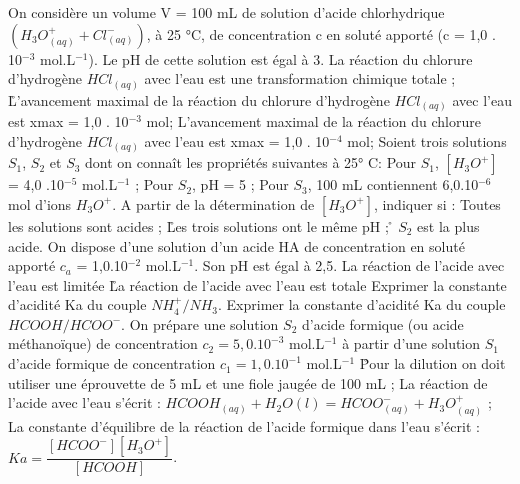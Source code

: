 \q	
   On considère un volume V = 100 mL de solution d'acide chlorhydrique $(H_3O^+_{(aq)} + Cl^-_{(aq)})$, à 25 °C, de concentration c en soluté apporté (c = 1,0 . 10$^{-3}$ mol.L$^{-1}$). Le pH de cette solution est égal à 3. 
\rv
  La réaction du chlorure d'hydrogène $HCl_{(aq)}$ avec l'eau est une transformation chimique totale ;
\r
  L'avancement maximal de la réaction du chlorure d'hydrogène $HCl_{(aq)}$ avec l'eau est xmax = 1,0 . 10$^{-3}$ mol;
  \rv
  L'avancement maximal de la réaction du chlorure d'hydrogène $HCl_{(aq)}$ avec l'eau est xmax = 1,0 . 10$^{-4}$ mol;
 \q	
Soient trois solutions $S_1$, $S_2$ et $S_3$ dont on connaît les propriétés suivantes à 25° C:
Pour $S_1$, $[H_3O^+]$ = 4,0 .10$^{-5}$ mol.L$^{-1}$ ;
Pour $S_2$, pH = 5 ;
Pour $S_3$, 100 mL contiennent 6,0.10$^{-6}$ mol d'ions $H_3O^+$.
A partir de la détermination de $[H_3O^+]$, indiquer si :
\rv
Toutes les solutions sont acides ;
\r
Les trois solutions ont le même pH ;
\r
$S_2$ est la plus acide.
\q	
On dispose d'une solution d'un acide HA de concentration en soluté apporté $c_a$ = 1,0.10$^{-2}$  mol.L$^{-1}$. Son pH est égal à  2,5.
\rv
La réaction de l'acide avec l'eau est limitée 
\r
La réaction de l'acide avec l'eau est totale
\q	
Exprimer la constante d'acidité Ka du couple $NH_4^+/ NH_3$.
\q	Exprimer la constante d'acidité Ka du couple $HCOOH/HCOO^{-}$.
   \q	
On prépare une solution $S_2$ d'acide formique (ou acide méthanoïque) de concentration        $c_2 = 5,0 . 10^{-3}$ mol.L$^{-1}$ à partir d'une solution $S_1$ d'acide formique de concentration $c_1 =1,0 . 10^{-1}$ mol.L$^{-1}$ 
\r
Pour la dilution on doit utiliser une éprouvette de 5 mL et une fiole jaugée de 100 mL ;
\rv 
La réaction de l'acide avec l'eau s'écrit :
$HCOOH_{(aq)}+H_2O(l) = HCOO^{-} _{(aq)}+ H_3O^+ _{(aq)}$ ;
\rv
La constante d'équilibre de la réaction de l'acide formique dans l'eau s'écrit :
$Ka=\dfrac{[HCOO^{-}][H_3O^+]}{[HCOOH]}$.

  
